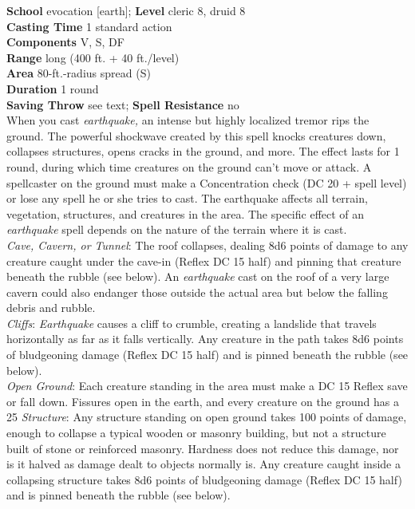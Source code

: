 \textbf{School} evocation [earth]; \textbf{Level} cleric 8, druid 8\\
\textbf{Casting Time} 1 standard action\\
\textbf{Components} V, S, DF\\
\textbf{Range} long (400 ft. + 40 ft./level)\\
\textbf{Area} 80-ft.-radius spread (S)\\
\textbf{Duration} 1 round\\
\textbf{Saving Throw} see text; \textbf{Spell Resistance} no\\
When you cast \textit{earthquake, }an intense but highly localized tremor rips the ground. The powerful shockwave created by this spell knocks creatures down, collapses structures, opens cracks in the ground, and more. The effect lasts for 1 round, during which time creatures on the ground can't move or attack. A spellcaster on the ground must make a Concentration check (DC 20 + spell level) or lose any spell he or she tries to cast. The earthquake affects all terrain, vegetation, structures, and creatures in the area. The specific effect of an \textit{earthquake }spell depends on the nature of the terrain where it is cast.\\
\textit{Cave, Cavern, or Tunnel}: The roof collapses, dealing 8d6 points of damage to any creature caught under the cave-in (Reflex DC 15 half) and pinning that creature beneath the rubble (see below). An \textit{earthquake }cast on the roof of a very large cavern could also endanger those outside the actual area but below the falling debris and rubble.\\
\textit{Cliffs}:\textit{ Earthquake }causes a cliff to crumble, creating a landslide that travels horizontally as far as it falls vertically. Any creature in the path takes 8d6 points of bludgeoning damage (Reflex DC 15 half) and is pinned beneath the rubble (see below).\\
\textit{Open Ground}: Each creature standing in the area must make a DC 15 Reflex save or fall down. Fissures open in the earth, and every creature on the ground has a 25%
\textit{Structure}: Any structure standing on open ground takes 100 points of damage, enough to collapse a typical wooden or masonry building, but not a structure built of stone or reinforced masonry. Hardness does not reduce this damage, nor is it halved as damage dealt to objects normally is. Any creature caught inside a collapsing structure takes 8d6 points of bludgeoning damage (Reflex DC 15 half) and is pinned beneath the rubble (see below).\\
